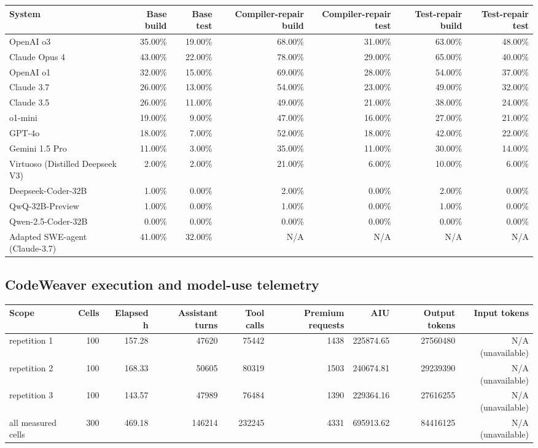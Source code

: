 \documentclass{article}
\begin{document}
\begin{tabular}{lrrrrrr}
\toprule
System & Base build & Base test & Compiler-repair build & Compiler-repair test & Test-repair build & Test-repair test \\
\midrule
OpenAI o3 & 35.00\% & 19.00\% & 68.00\% & 31.00\% & 63.00\% & 48.00\% \\
Claude Opus 4 & 43.00\% & 22.00\% & 78.00\% & 29.00\% & 65.00\% & 40.00\% \\
OpenAI o1 & 32.00\% & 15.00\% & 69.00\% & 28.00\% & 54.00\% & 37.00\% \\
Claude 3.7 & 26.00\% & 13.00\% & 54.00\% & 23.00\% & 49.00\% & 32.00\% \\
Claude 3.5 & 26.00\% & 11.00\% & 49.00\% & 21.00\% & 38.00\% & 24.00\% \\
o1-mini & 19.00\% & 9.00\% & 47.00\% & 16.00\% & 27.00\% & 21.00\% \\
GPT-4o & 18.00\% & 7.00\% & 52.00\% & 18.00\% & 42.00\% & 22.00\% \\
Gemini 1.5 Pro & 11.00\% & 3.00\% & 35.00\% & 11.00\% & 30.00\% & 14.00\% \\
Virtuoso (Distilled Deepseek V3) & 2.00\% & 2.00\% & 21.00\% & 6.00\% & 10.00\% & 6.00\% \\
Deepseek-Coder-32B & 1.00\% & 0.00\% & 2.00\% & 0.00\% & 2.00\% & 0.00\% \\
QwQ-32B-Preview & 1.00\% & 0.00\% & 1.00\% & 0.00\% & 1.00\% & 0.00\% \\
Qwen-2.5-Coder-32B & 0.00\% & 0.00\% & 0.00\% & 0.00\% & 0.00\% & 0.00\% \\
Adapted SWE-agent (Claude-3.7) & 41.00\% & 32.00\% & N/A & N/A & N/A & N/A \\
\bottomrule
\end{tabular}

\subsection*{CodeWeaver execution and model-use telemetry}

\begin{tabular}{lrrrrrrrr}
\toprule
Scope & Cells & Elapsed h & Assistant turns & Tool calls & Premium requests & AIU & Output tokens & Input tokens \\
\midrule
repetition 1 & 100 & 157.28 & 47620 & 75442 & 1438 & 225874.65 & 27560480 & N/A (unavailable) \\
repetition 2 & 100 & 168.33 & 50605 & 80319 & 1503 & 240674.81 & 29239390 & N/A (unavailable) \\
repetition 3 & 100 & 143.57 & 47989 & 76484 & 1390 & 229364.16 & 27616255 & N/A (unavailable) \\
all measured cells & 300 & 469.18 & 146214 & 232245 & 4331 & 695913.62 & 84416125 & N/A (unavailable) \\
\bottomrule
\end{tabular}
\end{document}
